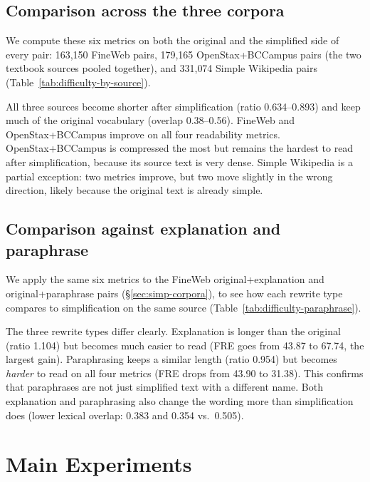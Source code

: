 \documentclass[11pt]{article}
\begin{document}
\subsection{Comparison across the three corpora}

We compute these six metrics on both the original and the simplified side of every pair: 163{,}150 FineWeb pairs, 179{,}165 OpenStax+BCCampus pairs (the two textbook sources pooled together), and 331{,}074 Simple Wikipedia pairs (Table~\ref{tab:difficulty-by-source}).


All three sources become shorter after simplification (ratio 0.634--0.893) and keep much of the original vocabulary (overlap 0.38--0.56). FineWeb and OpenStax+BCCampus improve on all four readability metrics. OpenStax+BCCampus is compressed the most but remains the hardest to read after simplification, because its source text is very dense. Simple Wikipedia is a partial exception: two metrics improve, but two move slightly in the wrong direction, likely because the original text is already simple.

\subsection{Comparison against explanation and paraphrase}
\label{sec:difficulty-paraphrase}

We apply the same six metrics to the FineWeb original+explanation and original+paraphrase pairs (\S\ref{sec:simp-corpora}), to see how each rewrite type compares to simplification on the same source (Table~\ref{tab:difficulty-paraphrase}).

The three rewrite types differ clearly. Explanation is longer than the original (ratio 1.104) but becomes much easier to read (FRE goes from 43.87 to 67.74, the largest gain). Paraphrasing keeps a similar length (ratio 0.954) but becomes \emph{harder} to read on all four metrics (FRE drops from 43.90 to 31.38). This confirms that paraphrases are not just simplified text with a different name. Both explanation and paraphrasing also change the wording more than simplification does (lower lexical overlap: 0.383 and 0.354 vs.\ 0.505).

\section{Main Experiments}
\end{document}
